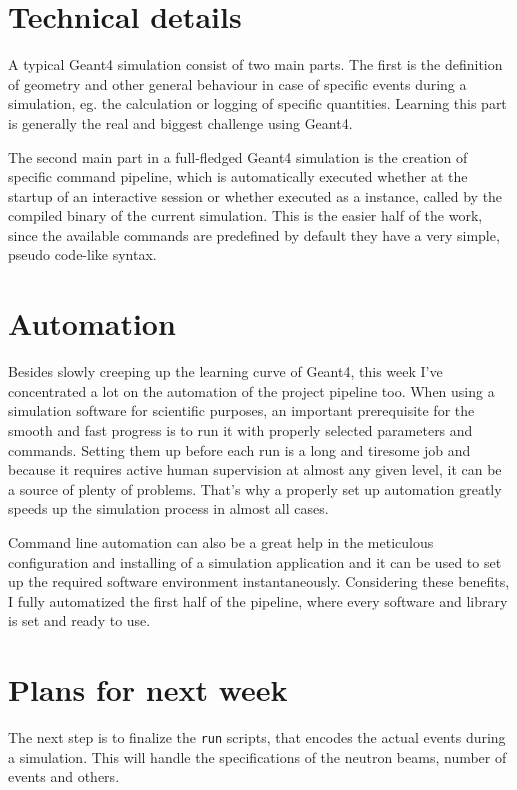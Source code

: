 \begin{multicols}{2}
\section{Technical details}
A typical Geant4 simulation consist of two main parts. The first is the definition of geometry and other general behaviour in case of specific events during a simulation, eg. the calculation or logging of specific quantities. Learning this part is generally the real and biggest challenge using Geant4.

The second main part in a full-fledged Geant4 simulation is the creation of specific command pipeline, which is automatically executed whether at the startup of an interactive session or whether executed as a  instance, called by the compiled binary of the current simulation. This is the easier half of the work, since the available commands are predefined by default they have a very simple, pseudo code-like syntax.

\section{Automation}
Besides slowly creeping up the learning curve of Geant4, this week I've concentrated a lot on the automation of the project pipeline too. When using a simulation software for scientific purposes, an important prerequisite for the smooth and fast progress is to run it with properly selected parameters and commands. Setting them up before each run is a long and tiresome job and because it requires active human supervision at almost any given level, it can be a source of plenty of problems. That's why a properly set up automation greatly speeds up the simulation process in almost all cases.

Command line automation can also be a great help in the meticulous configuration and installing of a simulation application and it can be used to set up the required software environment instantaneously. Considering these benefits, I fully automatized the first half of the pipeline, where every software and library is set and ready to use.

\section{Plans for next week}
The next step is to finalize the \texttt{run} scripts, that encodes the actual events during a simulation.  This will handle the specifications of the neutron beams, number of events and others.
\end{multicols}